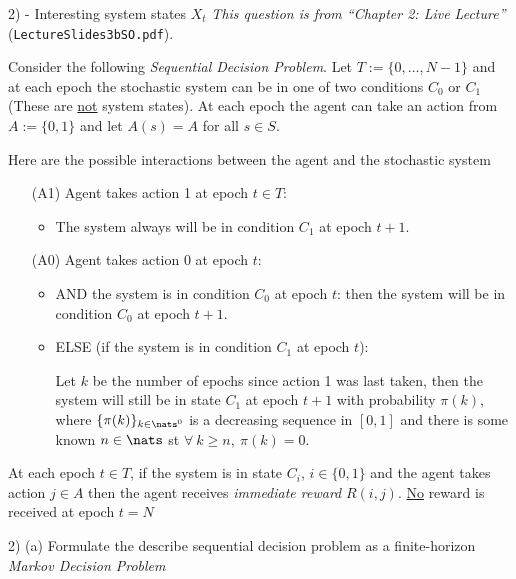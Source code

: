 \documentclass[11pt,a4paper]{article}
\begin{document}
\newpage
\begin{question}{2) - Interesting system states $X_t$}
  \textit{This question is from ``Chapter 2: Live Lecture''} (\texttt{LectureSlides3bSO.pdf}).
  \par Consider the following \textit{Sequential Decision Problem}. Let $T:=\{0,\dots,N-1\}$ and at each epoch the stochastic system can be in one of two conditions $C_0$ or $C_1$ (These are \underline{not} system states). At each epoch the agent can take an action from $A:=\{0,1\}$ and let $A(s)=A$ for all $s\in S$.
  \par Here are the possible interactions between the agent and the stochastic system
  \begin{itemize}
    \item[(A1)] Agent takes action 1 at epoch $t\in T$:
    \begin{itemize}
      \item The system always will be in condition $C_1$ at epoch $t+1$.
    \end{itemize}
    \item[(A0)] Agent takes action 0 at epoch $t$:
    \begin{itemize}
      \item AND the system is in condition $C_0$ at epoch $t$: then the system will be in condition $C_0$ at epoch $t+1$.
      \item ELSE (if the system is in condition $C_1$ at epoch $t$):
      \par Let $k$ be the number of epochs since action 1 was last taken, then the system will still be in state $C_1$ at epoch $t+1$ with probability $\pi(k)$, where $\{\pi(k)\}_{k\in\nats^0}$ is a decreasing sequence in $[0,1]$ and there is some known $n\in\nats$ st $\forall\ k\geq n,\ \pi(k)=0$.
    \end{itemize}
  \end{itemize}
  At each epoch $t\in T$, if the system is in state $C_i$, $i\in\{0,1\}$ and the agent takes action $j\in A$ then the agent receives \textit{immediate reward} $R(i,j)$. \underline{No} reward is received at epoch $t=N$
\end{question}

\begin{question}{2) (a)}
  Formulate the describe sequential decision problem as a finite-horizon \textit{Markov Decision Problem}
\end{question}
\end{document}
